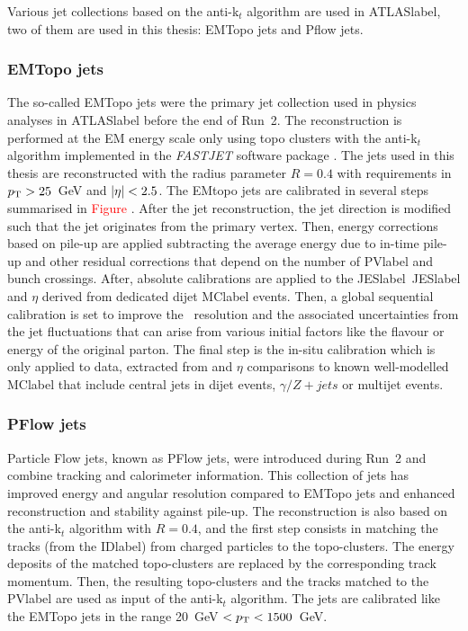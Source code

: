Various jet collections based on the anti-k$_t$ algorithm are used in \acrshort{ATLASlabel}, two of them are used in this thesis: EMTopo jets and Pflow jets.

\subsubsection{EMTopo jets}

The so-called EMTopo jets were the primary jet collection used in physics analyses in \acrshort{ATLASlabel} before the end of Run~2. The reconstruction is performed at the EM energy scale only using topo clusters %
with the anti-k$_t$ algorithm implemented in the \textit{FASTJET} software package %
. The jets used in this thesis are reconstructed with the radius parameter $R = 0.4$ with requirements in $p_{\text{T}} > 25$~GeV and $\abs{\eta} < 2.5$. The EMtopo jets are calibrated in several steps summarised in \textcolor{red}{Figure} %
. After the jet reconstruction, the jet direction is modified such that the jet originates from the primary vertex. Then, energy corrections based on pile-up are applied subtracting the average energy due to in-time pile-up and other residual corrections that depend on the number of \acrshort{PVlabel} and bunch crossings. After, absolute calibrations are applied to the \acrlong{JESlabel}~\acrshort{JESlabel} and $\eta$ derived from dedicated dijet \acrshort{MClabel} events. Then, a global sequential calibration is set to improve the \pT\ resolution and the associated
uncertainties from the jet fluctuations that can arise from various initial factors like the flavour or energy of the original parton. The final step is the in-situ calibration which is only applied to data, extracted from \pT and $\eta$ comparisons to known well-modelled \acrshort{MClabel} that include central jets in dijet events, $\gamma/Z+jets$ or multijet events. 

\subsubsection{PFlow jets}

Particle Flow jets, known as PFlow jets, were introduced during Run~2 and combine tracking and calorimeter information. This collection of jets has improved energy and angular resolution compared to EMTopo jets and enhanced reconstruction and stability against pile-up. The reconstruction %
is also based on the anti-k$_t$ algorithm with $R=0.4$, and the first step consists in matching the tracks (from the \acrshort{IDlabel}) from charged particles to the topo-clusters. The energy deposits of the matched topo-clusters are replaced by the corresponding track momentum. Then, the resulting topo-clusters and the tracks matched to the \acrshort{PVlabel} are used as input of the anti-k$_t$ algorithm. The jets are calibrated like the EMTopo jets in the range 20~GeV $<p_{\text{T}}<1500$~GeV. 

